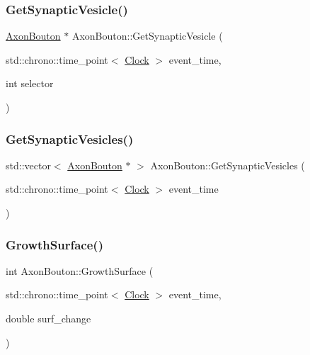 \mbox{\label{classAxonBouton_a847ab3d3d214ddc85bdfd463c6d95d54}} 
\subsubsection{\texorpdfstring{Get\+Synaptic\+Vesicle()}{GetSynapticVesicle()}}
{\footnotesize\ttfamily \mbox{\hyperlink{classAxonBouton}{Axon\+Bouton}} $\ast$ Axon\+Bouton\+::\+Get\+Synaptic\+Vesicle (\begin{DoxyParamCaption}\item[{std\+::chrono\+::time\+\_\+point$<$ \mbox{\hyperlink{universe_8h_a0ef8d951d1ca5ab3cfaf7ab4c7a6fd80}{Clock}} $>$}]{event\+\_\+time,  }\item[{int}]{selector }\end{DoxyParamCaption})}

\mbox{\label{classAxonBouton_af9a35ff7a6c32ac291021cccb3d40c9b}} 
\subsubsection{\texorpdfstring{Get\+Synaptic\+Vesicles()}{GetSynapticVesicles()}}
{\footnotesize\ttfamily std\+::vector$<$ \mbox{\hyperlink{classAxonBouton}{Axon\+Bouton}} $\ast$ $>$ Axon\+Bouton\+::\+Get\+Synaptic\+Vesicles (\begin{DoxyParamCaption}\item[{std\+::chrono\+::time\+\_\+point$<$ \mbox{\hyperlink{universe_8h_a0ef8d951d1ca5ab3cfaf7ab4c7a6fd80}{Clock}} $>$}]{event\+\_\+time }\end{DoxyParamCaption})}

\mbox{\label{classAxonBouton_a95fc006b2436e2c7784af2cc0bc9522e}} 
\subsubsection{\texorpdfstring{Growth\+Surface()}{GrowthSurface()}}
{\footnotesize\ttfamily int Axon\+Bouton\+::\+Growth\+Surface (\begin{DoxyParamCaption}\item[{std\+::chrono\+::time\+\_\+point$<$ \mbox{\hyperlink{universe_8h_a0ef8d951d1ca5ab3cfaf7ab4c7a6fd80}{Clock}} $>$}]{event\+\_\+time,  }\item[{double}]{surf\+\_\+change }\end{DoxyParamCaption})}

